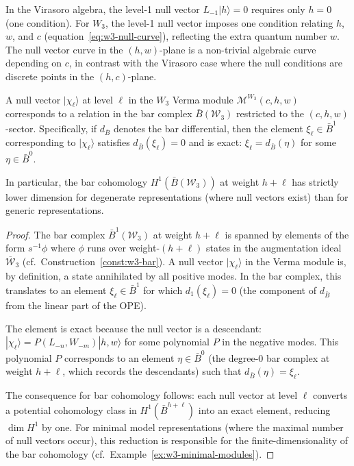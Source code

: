 \begin{remark}\label{rem:w3-vs-vir-null}
In the Virasoro algebra, the level-1 null vector
$L_{-1}|h\rangle = 0$ requires only $h = 0$ (one condition).
For $W_3$, the level-1 null vector imposes one condition
relating $h$, $w$, and $c$ (equation~\eqref{eq:w3-null-curve}),
reflecting the extra quantum number $w$.
The null vector curve in the $(h,w)$-plane
is a non-trivial algebraic curve depending on $c$, in contrast
with the Virasoro case where the null conditions are discrete
points in the $(h,c)$-plane.
\end{remark}

\begin{proposition}\label{prop:null-bar-relation}
A null vector $|\chi_\ell\rangle$ at level $\ell$ in the $W_3$
Verma module $\mathcal{M}^{W_3}(c,h,w)$ corresponds to a
relation in the bar complex $\bar{B}(\mathcal{W}_3)$ restricted
to the $(c,h,w)$-sector.  Specifically, if $d_{\bar{B}}$ denotes
the bar differential, then the element $\xi_\ell \in \bar{B}^1$
corresponding to $|\chi_\ell\rangle$ satisfies
$d_{\bar{B}}(\xi_\ell) = 0$ and is exact:
$\xi_\ell = d_{\bar{B}}(\eta)$ for some $\eta \in \bar{B}^0$.

In particular, the bar cohomology $H^1(\bar{B}(\mathcal{W}_3))$
at weight $h + \ell$ has strictly lower dimension for degenerate
representations (where null vectors exist) than for generic
representations.
\end{proposition}

\begin{proof}
The bar complex $\bar{B}^1(\mathcal{W}_3)$ at weight $h + \ell$
is spanned by elements of the form $s^{-1}\phi$ where $\phi$ runs
over weight-$(h+\ell)$ states in the augmentation ideal
$\overline{\mathcal{W}}_3$ (cf.\ Construction~\ref{const:w3-bar}).
A null vector $|\chi_\ell\rangle$ in the Verma module is, by
definition, a state annihilated by all positive modes.  In the
bar complex, this translates to an element $\xi_\ell \in \bar{B}^1$
for which $d_1(\xi_\ell) = 0$ (the component of $d_{\bar{B}}$
from the linear part of the OPE).

The element is exact because the null vector is a descendant:
$|\chi_\ell\rangle = P(L_{-n}, W_{-m})|h,w\rangle$ for some
polynomial $P$ in the negative modes.  This polynomial $P$
corresponds to an element $\eta \in \bar{B}^0$ (the degree-0
bar complex at weight $h + \ell$, which records the descendants)
such that $d_{\bar{B}}(\eta) = \xi_\ell$.

The consequence for bar cohomology follows: each null vector
at level $\ell$ converts a potential cohomology class in
$H^1(\bar{B}^{h+\ell})$ into an exact element, reducing
$\dim H^1$ by one.  For minimal model representations (where
the maximal number of null vectors occur), this reduction is
responsible for the finite-dimensionality of the bar cohomology
(cf.\ Example~\ref{ex:w3-minimal-modules}).
\end{proof}

